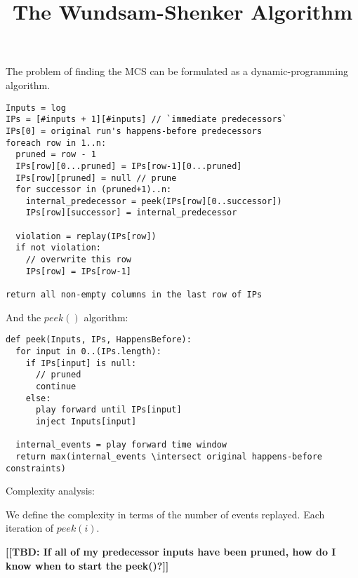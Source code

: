 \documentclass[letterpaper,10pt]{article}
\newcommand{\tbd}[1]{{\bf [[TBD: {#1}]]}}
\begin{document}
\title{The Wundsam-Shenker Algorithm\textsuperscript{\texttrademark}}
\date{}
\maketitle

The problem of finding the MCS can be formulated as a dynamic-programming
algorithm. 

\begin{verbatim}
Inputs = log
IPs = [#inputs + 1][#inputs] // `immediate predecessors`
IPs[0] = original run's happens-before predecessors
foreach row in 1..n:
  pruned = row - 1
  IPs[row][0...pruned] = IPs[row-1][0...pruned]
  IPs[row][pruned] = null // prune
  for successor in (pruned+1)..n:
    internal_predecessor = peek(IPs[row][0..successor])
    IPs[row][successor] = internal_predecessor
  
  violation = replay(IPs[row])
  if not violation:
    // overwrite this row
    IPs[row] = IPs[row-1]

return all non-empty columns in the last row of IPs
\end{verbatim}

And the $peek()$ algorithm:

\begin{verbatim}
def peek(Inputs, IPs, HappensBefore):
  for input in 0..(IPs.length):
    if IPs[input] is null:
      // pruned
      continue
    else:
      play forward until IPs[input]
      inject Inputs[input]

  internal_events = play forward time window
  return max(internal_events \intersect original happens-before constraints)
\end{verbatim}

Complexity analysis:

We define the complexity in terms of the number of events replayed. Each
iteration of $peek(i)$.

\tbd{If all of my predecessor inputs have been pruned, how do I know when to
start the peek()?}
\end{document}
